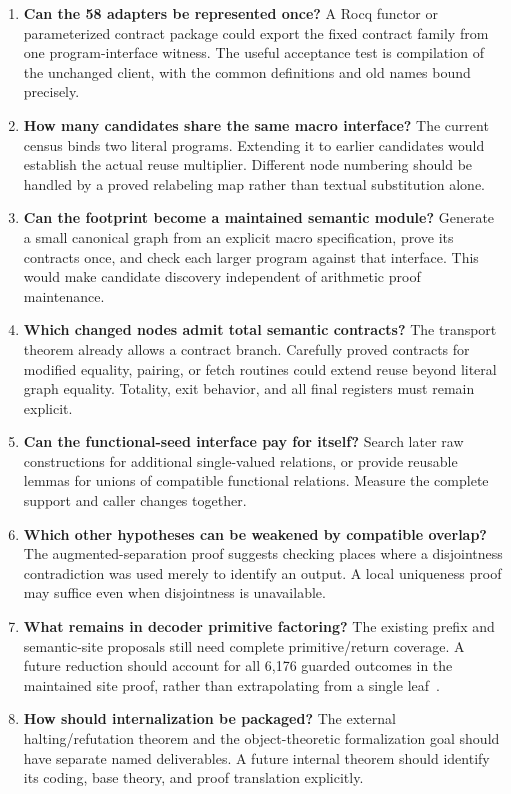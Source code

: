 \documentclass[11pt,letterpaper]{article}
\theoremstyle{definition}\newtheorem{definition}[theorem]{Definition}
\theoremstyle{remark}\newtheorem{remark}[theorem]{Remark}
\begin{document}
\begin{enumerate}
\item \textbf{Can the 58 adapters be represented once?} A Rocq functor or parameterized contract package could export the fixed contract family from one program-interface witness. The useful acceptance test is compilation of the unchanged client, with the common definitions and old names bound precisely.
\item \textbf{How many candidates share the same macro interface?} The current census binds two literal programs. Extending it to earlier candidates would establish the actual reuse multiplier. Different node numbering should be handled by a proved relabeling map rather than textual substitution alone.
\item \textbf{Can the footprint become a maintained semantic module?} Generate a small canonical graph from an explicit macro specification, prove its contracts once, and check each larger program against that interface. This would make candidate discovery independent of arithmetic proof maintenance.
\item \textbf{Which changed nodes admit total semantic contracts?} The transport theorem already allows a contract branch. Carefully proved contracts for modified equality, pairing, or fetch routines could extend reuse beyond literal graph equality. Totality, exit behavior, and all final registers must remain explicit.
\item \textbf{Can the functional-seed interface pay for itself?} Search later raw constructions for additional single-valued relations, or provide reusable lemmas for unions of compatible functional relations. Measure the complete support and caller changes together.
\item \textbf{Which other hypotheses can be weakened by compatible overlap?} The augmented-separation proof suggests checking places where a disjointness contradiction was used merely to identify an output. A local uniqueness proof may suffice even when disjointness is unavailable.
\item \textbf{What remains in decoder primitive factoring?} The existing prefix and semantic-site proposals still need complete primitive/return coverage. A future reduction should account for all 6,176 guarded outcomes in the maintained site proof, rather than extrapolating from a single leaf~\cite{phase14,index}.
\item \textbf{How should internalization be packaged?} The external halting/refutation theorem and the object-theoretic formalization goal should have separate named deliverables. A future internal theorem should identify its coding, base theory, and proof translation explicitly.
\end{enumerate}
\end{document}
